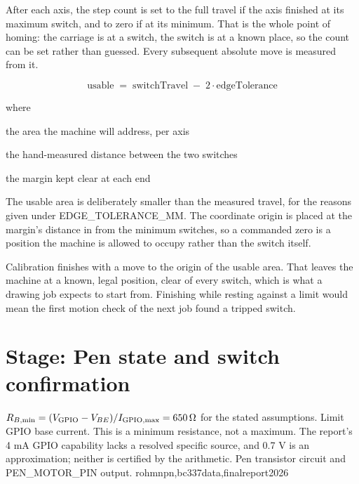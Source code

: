 After each axis, the step count is set to the full travel if the axis finished at its maximum switch, and to zero if at its minimum. That is the whole point of homing: the carriage is at a switch, the switch is at a known place, so the count can be set rather than guessed. Every subsequent absolute move is measured from it.



\begin{equation}
\mathrm{usable} \;=\; \mathrm{switchTravel} \;-\; 2 \cdot \mathrm{edgeTolerance}
\end{equation}

\noindent where
\begin{description}[leftmargin=2.4em,style=nextline,font=\normalfont\ttfamily]\setlength\itemsep{1pt}
  \item[{$\mathrm{usable}$}] \normalfont the area the machine will address, per axis
  \item[{$\mathrm{switchTravel}$}] \normalfont the hand-measured distance between the two switches
  \item[{$\mathrm{edgeTolerance}$}] \normalfont the margin kept clear at each end
\end{description}
The usable area is deliberately smaller than the measured travel, for the reasons given under EDGE\_TOLERANCE\_MM. The coordinate origin is placed at the margin's distance in from the minimum switches, so a commanded zero is a position the machine is allowed to occupy rather than the switch itself.


Calibration finishes with a move to the origin of the usable area. That leaves the machine at a known, legal position, clear of every switch, which is what a drawing job expects to start from. Finishing while resting against a limit would mean the first motion check of the next job found a tripped switch.



\section*{Stage: Pen state and switch confirmation}
{$R_{B,\min}=(V_{\rm GPIO}-V_{BE})/I_{\rm GPIO,max}=650\,\Omega$ for the stated assumptions.}
{Limit GPIO base current. This is a minimum resistance, not a maximum. The
report's 4 mA GPIO capability lacks a resolved specific source, and 0.7 V is
an approximation; neither is certified by the arithmetic.}
{Pen transistor circuit and PEN\_MOTOR\_PIN output.}
{rohmnpn,bc337data,finalreport2026}

